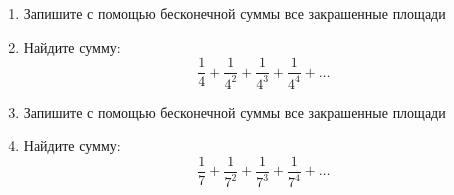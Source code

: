 \documentclass[a4paper, 12pt]{article}
\begin{document}
\begin{enumerate}

    \vspace{5cm}


\newpage
\item Запишите с помощью бесконечной суммы все  закрашенные площади 

 \vspace{5cm}


\item Найдите сумму:
\[
  \frac{1}{4} + \frac{1}{4^2} + \frac{1}{4^3} + \frac{1}{4^4} + \ldots
\]


\item Запишите с помощью бесконечной суммы все  закрашенные площади 

  \vspace{5cm}
  


\item Найдите сумму:
\[
  \frac{1}{7} + \frac{1}{7^2} + \frac{1}{7^3} + \frac{1}{7^4} + \ldots
\]
\end{enumerate}
\end{document}

